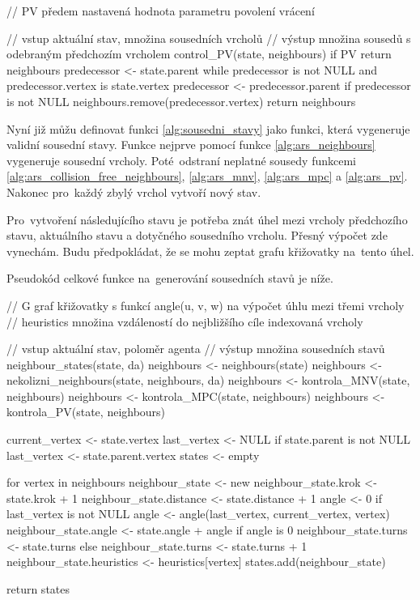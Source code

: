 \begin{code}[fontsize=\footnotesize]
// PV předem nastavená hodnota parametru povolení vrácení

// vstup aktuální stav, množina sousedních vrcholů
// výstup množina sousedů s odebraným předchozím vrcholem
control_PV(state, neighbours)
  if PV
    return neighbours
  predecessor <- state.parent
  while predecessor is not NULL and predecessor.vertex is state.vertex
    predecessor <- predecessor.parent
  if predecessor is not NULL
    neighbours.remove(predecessor.vertex)
  return neighbours
\end{code}

Nyní již můžu definovat funkci \ref{alg:sousedni_stavy} jako funkci, která vygeneruje validní sousední stavy.
Funkce nejprve pomocí funkce \ref{alg:ars_neighbours} vygeneruje sousední vrcholy.
Poté~odstraní neplatné sousedy funkcemi \ref{alg:ars_collision_free_neighbours},
\ref{alg:ars_mnv}, \ref{alg:ars_mpc} a \ref{alg:ars_pv}.
Nakonec pro~každý zbylý vrchol vytvoří nový stav.

Pro~vytvoření následujícího stavu je potřeba znát
úhel mezi vrcholy předchozího stavu, aktuálního stavu a dotyčného sousedního vrcholu.
Přesný výpočet zde vynechám.
Budu předpokládat, že se mohu zeptat grafu křižovatky na~tento úhel.

Pseudokód celkové funkce na~generování sousedních stavů je níže.


\begin{code}[fontsize=\footnotesize]
// G graf křižovatky s funkcí angle(u, v, w) na výpočet úhlu mezi třemi vrcholy
// heuristics množina vzdáleností do nejbližšího cíle indexovaná vrcholy

// vstup aktuální stav, poloměr agenta
// výstup množina sousedních stavů
neighbour_states(state, da)
  neighbours <- neighbours(state)
  neighbours <- nekolizni_neighbours(state, neighbours, da)
  neighbours <- kontrola_MNV(state, neighbours)
  neighbours <- kontrola_MPC(state, neighbours)
  neighbours <- kontrola_PV(state, neighbours)

  current_vertex <- state.vertex
  last_vertex <- NULL
  if state.parent is not NULL
    last_vertex <- state.parent.vertex
  states <- empty

  for vertex in neighbours
    neighbour_state <- new
    neighbour_state.krok <- state.krok + 1
    neighbour_state.distance <- state.distance + 1
    angle <- 0
    if last_vertex is not NULL
      angle <- angle(last_vertex, current_vertex, vertex)
    neighbour_state.angle <- state.angle + angle
    if angle is 0
      neighbour_state.turns <- state.turns
    else
      neighbour_state.turns <- state.turns + 1
    neighbour_state.heuristics <- heuristics[vertex]
    states.add(neighbour_state)

  return states
\end{code}

